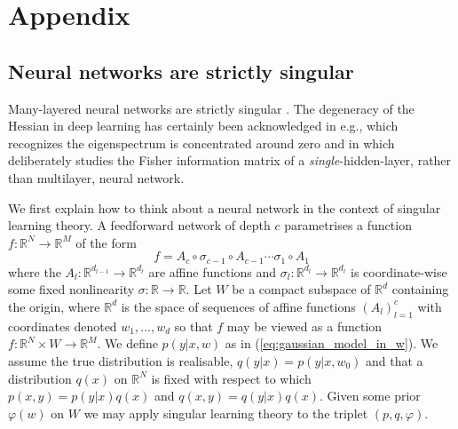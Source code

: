 \documentclass{article} %
\def\lto{\longrightarrow}
\begin{document}

%





\appendix
\section{Appendix}

\subsection{Neural networks are strictly singular}
\label{appendix:nn_singular}
Many-layered neural networks are strictly singular \citep[\S 7.2]{watanabe_algebraic_2009}. The degeneracy of the Hessian in deep learning has certainly been acknowledged in e.g., \citet{DBLP:journals/corr/SagunBL16} which recognizes the eigenspectrum is concentrated around zero and in \citet{pennington_spectrum_2018} which deliberately studies the Fisher information matrix of a \textit{single}-hidden-layer, rather than multilayer, neural network. 

We first explain how to think about a neural network in the context of singular learning theory. A feedforward network of depth $c$ parametrises a function $f: \mathbb{R}^N \lto \mathbb{R}^M$ of the form
\[
f = A_c \circ \sigma_{c-1} \circ A_{c-1} \cdots \sigma_1 \circ A_1
\]
where the $A_l: \mathbb{R}^{d_{l-1}} \lto \mathbb{R}^{d_{l}}$ are affine functions and $\sigma_l: \mathbb{R}^{d_{l}} \lto \mathbb{R}^{d_{l}}$ is coordinate-wise some fixed nonlinearity $\sigma: \mathbb{R} \lto \mathbb{R}$. Let $W$ be a compact subspace of $\mathbb{R}^d$ containing the origin, where $\mathbb{R}^d$ is the space of sequences of affine functions $(A_l)_{l=1}^c$ with coordinates denoted $w_1,\ldots,w_d$ so that $f$ may be viewed as a function $f: \mathbb{R}^N \times W \lto \mathbb{R}^M$. We define $p(y|x,w)$ as in (\ref{eq:gaussian_model_in_w}). We assume the true distribution is realisable, $q(y|x) = p(y|x,w_0)$ and that a distribution $q(x)$ on $\mathbb{R}^N$ is fixed with respect to which $p(x,y) = p(y|x)q(x)$ and $q(x,y) = q(y|x)q(x)$. Given some prior $\varphi(w)$ on $W$ we may apply singular learning theory to the triplet $(p,q,\varphi)$.
\end{document}
